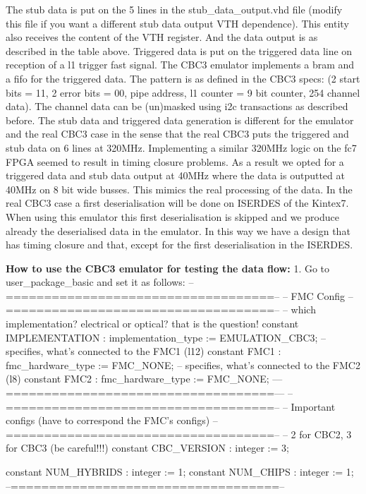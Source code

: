 The stub data is put on the 5 lines in the stub_data_output.vhd file (modify this file if you want a different stub data output VTH dependence). This entity also receives the content of the VTH register. And the data output is as described in the table above.
Triggered data is put on the triggered data line on reception of a l1 trigger fast signal. The CBC3 emulator implements a bram and a fifo for the triggered data. The pattern is as defined in the CBC3 specs: (2 start bits = 11,  2 error bits = 00, pipe address, l1 counter = 9 bit counter, 254 channel data). The channel data can be (un)masked using i2c transactions as described before. 
The stub data and triggered data generation is different for the emulator and the real CBC3 case in the sense that the real CBC3 puts the triggered and stub data on 6 lines at 320MHz. Implementing a similar 320MHz logic on the fc7 FPGA seemed to result in timing closure problems. As a result we opted for a triggered data and stub data output at 40MHz where the data is outputted at 40MHz on 8 bit wide busses. This mimics the real processing of the data. In the real CBC3 case a first deserialisation will be done on ISERDES of the Kintex7. When using this emulator this first deserialisation is skipped and we produce already the deserialised data in the emulator. In this way we have a design that has timing closure and that, except for the first deserialisation in the ISERDES.




\textbf{How to use the CBC3 emulator for testing the data flow:}
1. Go to user_package_basic and set it as follows:
--===================================--
    -- FMC Config
    --===================================--
    -- which implementation? electrical or optical? that is the question!
    constant IMPLEMENTATION         : implementation_type := EMULATION_CBC3;
    -- specifies, what's connected to the FMC1 (l12)
    constant FMC1                   : fmc_hardware_type := FMC_NONE;
    -- specifies, what's connected to the FMC2 (l8)
    constant FMC2                   : fmc_hardware_type := FMC_NONE;
    —===================================—
 --===================================--
    -- Important configs (have to correspond the FMC's configs)
    --===================================--
    -- 2 for CBC2, 3 for CBC3 (be careful!!!)
    constant CBC_VERSION            : integer := 3;     

    constant NUM_HYBRIDS            : integer := 1;
    constant NUM_CHIPS              : integer := 1;    
    --===================================--

